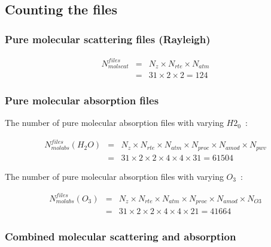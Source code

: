 \documentclass[a4paper]{article}
\begin{document}
\subsection{Counting the files}

\subsubsection{Pure molecular scattering files (Rayleigh)}

\begin{eqnarray}
N^{files}_{molscat} & = & N_z \times N_{rte} \times N_{atm} \\ \nonumber
                               & = & 31 \times 2 \times 2  = 124
\end{eqnarray}

\subsubsection{Pure molecular absorption files}

The number of pure molecular absorption files with varying $H2_0$~:

\begin{eqnarray}
N^{files}_{molabs}(H_2O) & = & N_z \times N_{rte} \times N_{atm} \times N_{proc} \times N_{amod} \times N_{pwv} \\ \nonumber
                                          & =  & 31   \times   2        \times    2         \times     4        \times     4            \times 31 = 61504
\end{eqnarray}

The number of pure molecular absorption files with varying $O_3$~:

\begin{eqnarray}
N^{files}_{molabs}(O_3) & = & N_z \times N_{rte} \times N_{atm} \times N_{proc} \times N_{amod} \times N_{O3} \\ \nonumber
                                          & =  & 31   \times   2        \times    2         \times     4        \times     4            \times 21 = 41664
\end{eqnarray}



\subsubsection{Combined molecular scattering and absorption}
\end{document}
